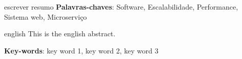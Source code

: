\setlength{\absparsep}{18pt} %
\begin{resumo}

  escrever resumo
 \textbf{Palavras-chaves}: Software, Escalabilidade, Performance, Sistema web, Microserviço
\end{resumo}

\begin{resumo}[Abstract]
 \begin{otherlanguage*}{english}
   This is the english abstract.

   \vspace{\onelineskip}

   \noindent
   \textbf{Key-words}: key word 1, key word 2, key word 3
 \end{otherlanguage*}
\end{resumo}
